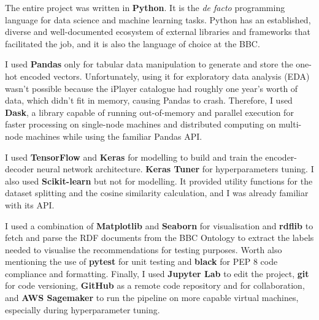 The entire project was written in \textbf{Python}. It is the \textit{de facto} programming language for data science
and machine learning tasks. Python has an established, diverse and well-documented ecosystem of external libraries
and frameworks that facilitated the job, and it is also the language of choice at the BBC.

I used \textbf{Pandas} only for tabular data manipulation to generate and store the one-hot encoded vectors.
Unfortunately, using it for exploratory data analysis (EDA) wasn't possible because the iPlayer catalogue
had roughly one year's worth of data, which didn't fit in memory, causing Pandas to crash.
Therefore, I used \textbf{Dask}, a library capable of running out-of-memory and parallel execution
for faster processing on single-node machines and distributed computing on multi-node machines
while using the familiar Pandas API.

I used \textbf{TensorFlow} and \textbf{Keras} for modelling to build and train the encoder-decoder neural network architecture.
\textbf{Keras Tuner} for hyperparameters tuning.
I also used \textbf{Scikit-learn} but not for modelling. It provided utility functions for the dataset splitting and
the cosine similarity calculation, and I was already familiar with its API.

I used a combination of \textbf{Matplotlib} and \textbf{Seaborn} for visualisation and \textbf{rdflib} to fetch and parse
the RDF documents from the BBC Ontology to extract the labels needed to visualise the recommendations for testing purposes.
Worth also mentioning the use of \textbf{pytest} for unit testing and \textbf{black} for PEP 8 code compliance and formatting.
Finally, I used \textbf{Jupyter Lab} to edit the project, \textbf{git} for code versioning, \textbf{GitHub} as a remote code repository
and for collaboration, and \textbf{AWS Sagemaker} to run the pipeline on more capable virtual machines, especially during hyperparameter tuning.
